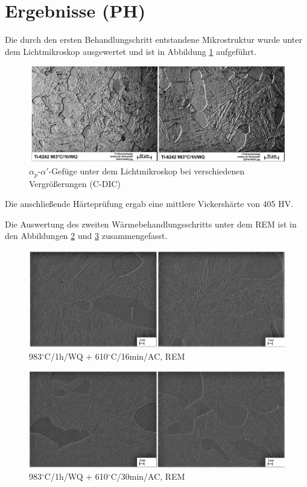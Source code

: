 \section{Ergebnisse (PH)}

Die durch den ersten Behandlungschritt entstandene Mikrostruktur wurde unter dem Lichtmikroskop ausgewertet und ist in Abbildung \ref{fig:abbildung-19} aufgeführt.

\begin{figure}
	\centering
	\includegraphics[width=1.0\linewidth]{./Bilder/Abbildung 19.png}
	\caption[Abbildung 19]{$\alpha_p$-$\alpha'$-Gefüge unter dem Lichtmikroskop bei verschiedenen Vergrößerungen (C-DIC)}
	\label{fig:abbildung-19}
\end{figure}

Die anschließende Härteprüfung ergab eine mittlere Vickershärte von 405 HV.

\pagebreak

Die Auswertung des zweiten Wärmebehandlungsschritts unter dem REM ist in den Abbildungen \ref{fig:abbildung-26} und \ref{fig:abbildung-27} zusammengefasst.

\begin{figure}[h]
	\centering
	\includegraphics[width=1.0\linewidth]{./Bilder/Abbildung 26.png}
	\caption[Abbildung 26]{983$^\circ$C/1h/WQ + 610$^\circ$C/16min/AC, REM}
	\label{fig:abbildung-26}
\end{figure}

\begin{figure}[h]
	\centering
	\includegraphics[width=1.0\linewidth]{./Bilder/Abbildung 27.png}
	\caption[Abbildung 27]{983$^\circ$C/1h/WQ + 610$^\circ$C/30min/AC, REM}
	\label{fig:abbildung-27}
\end{figure}


